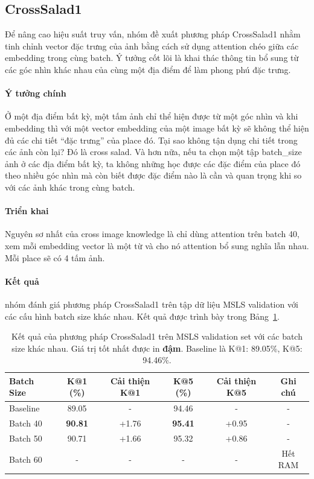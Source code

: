 \subsection{CrossSalad1}
Để nâng cao hiệu suất truy vấn, nhóm đề xuất phương pháp CrossSalad1 nhằm tinh chỉnh vector đặc trưng của ảnh bằng cách sử dụng attention chéo giữa các embedding trong cùng batch. Ý tưởng cốt lõi là khai thác thông tin bổ sung từ các góc nhìn khác nhau của cùng một địa điểm để làm phong phú đặc trưng.

\paragraph{Ý tưởng chính}
Ở một địa điểm bất kỳ, một tấm ảnh chỉ thể hiện được từ một góc nhìn và khi embedding thì với một vector embedding của một image bất kỳ sẽ không thể hiện đủ các chi tiết ``đặc trưng'' của place đó. Tại sao không tận dụng chi tiết trong các ảnh còn lại? Đó là cross salad. Và hơn nữa, nếu ta chọn một tập batch\_size ảnh ở các địa điểm bất kỳ, ta không những học được các đặc điểm của place đó theo nhiều góc nhìn mà còn biết được đặc điểm nào là cần và quan trọng khi so với các ảnh khác trong cùng batch.

\paragraph{Triển khai}
Nguyên sơ nhất của cross image knowledge là chỉ dùng attention trên batch 40, xem mỗi embedding vector là một từ và cho nó attention bổ sung nghĩa lẫn nhau. Mỗi place sẽ có 4 tấm ảnh.

\paragraph{Kết quả}
nhóm đánh giá phương pháp CrossSalad1 trên tập dữ liệu MSLS validation với các cấu hình batch size khác nhau. Kết quả được trình bày trong Bảng~\ref{tab:crosssalad1_results}.

\begin{table}[t]
\centering
\caption{Kết quả của phương pháp CrossSalad1 trên MSLS validation set với các batch size khác nhau. Giá trị tốt nhất được in \textbf{đậm}. Baseline là K@1: 89.05\%, K@5: 94.46\%.}
\label{tab:crosssalad1_results}
\small
\begin{tabular}{@{}lccccc@{}}
\toprule
\textbf{Batch Size} & \textbf{K@1 (\%)} & \textbf{Cải thiện K@1} & \textbf{K@5 (\%)} & \textbf{Cải thiện K@5} & \textbf{Ghi chú} \\
\midrule
Baseline & 89.05 & - & 94.46 & - & - \\
Batch 40 & \textbf{90.81} & +1.76 & \textbf{95.41} & +0.95 & - \\
Batch 50 & 90.71 & +1.66 & 95.32 & +0.86 & - \\
Batch 60 & - & - & - & - & Hết RAM \\
\bottomrule
\end{tabular}
\end{table}


